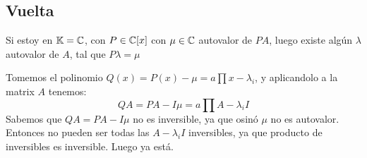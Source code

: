 \documentclass{article}
\begin{document}
\subsection*{Vuelta}
Si estoy en $\mathbb{K} = \mathbb{C}$, con $P \in \mathbb{C}[x]$ con $\mu \in \mathbb{C}$ autovalor de $PA$, luego existe algún $\lambda$ autovalor de $A$, tal que $P\lambda = \mu$

Tomemos el polinomio $Q(x) = P(x) - \mu = a\prod x - \lambda_i$, y aplicandolo a la matrix $A$ tenemos:
\[
    QA = PA - I\mu = a \prod A - \lambda_i I
\]
Sabemos que $QA = PA - I \mu$ no es inversible, ya que osinó $\mu$ no es autovalor. Entonces no pueden ser todas las $A - \lambda_i I$ inversibles, ya que producto de inversibles es inversible. Luego ya está.
\end{document}
